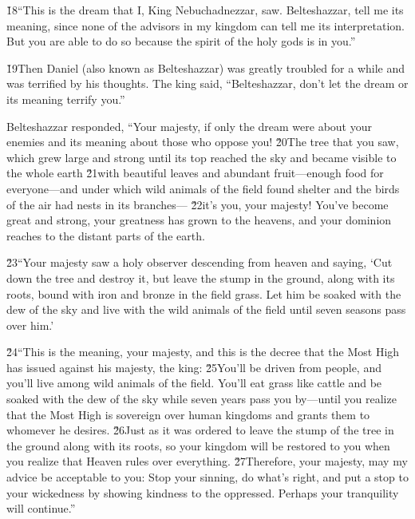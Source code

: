 \begin{poetry}
\poeml \v{18}``This is the dream that I, King Nebuchadnezzar, saw. Belteshazzar, tell me its meaning, since none of the advisors in my kingdom can tell me its interpretation. But you are able to do so because the spirit of the holy gods is in you.''
\end{poetry}

\v{19}Then Daniel (also known as Belteshazzar) was greatly troubled for a while and was terrified by his thoughts. The king said, ``Belteshazzar, don't let the dream or its meaning terrify you.''

Belteshazzar responded, ``Your majesty, if only the dream were about your enemies and its meaning about those who oppose you! \v{20}The tree that you saw, which grew large and strong until its top reached the sky and became visible to the whole earth \v{21}with beautiful leaves and abundant fruit---enough food for everyone---and under which wild animals of the field found shelter and the birds of the air had nests in its branches--- \v{22}it's you, your majesty! You've become great and strong, your greatness has grown to the heavens, and your dominion reaches to the distant parts of the earth.

\v{23}``Your majesty saw a holy observer descending from heaven and saying, `Cut down the tree and destroy it, but leave the stump in the ground, along with its roots, bound with iron and bronze in the field grass. Let him be soaked with the dew of the sky and live with the wild animals of the field until seven seasons pass over him.'

\v{24}``This is the meaning, your majesty, and this is the decree that the Most High has issued against his majesty, the king: \v{25}You'll be driven from people, and you'll live among wild animals of the field. You'll eat grass like cattle and be soaked with the dew of the sky while seven years pass you by---until you realize that the Most High is sovereign over human kingdoms and grants them to whomever he desires. \v{26}Just as it was ordered to leave the stump of the tree in the ground along with its roots, so your kingdom will be restored to you when you realize that Heaven rules over everything. \v{27}Therefore, your majesty, may my advice be acceptable to you: Stop your sinning, do what's right, and put a stop to your wickedness by showing kindness to the oppressed. Perhaps your tranquility will continue.''

